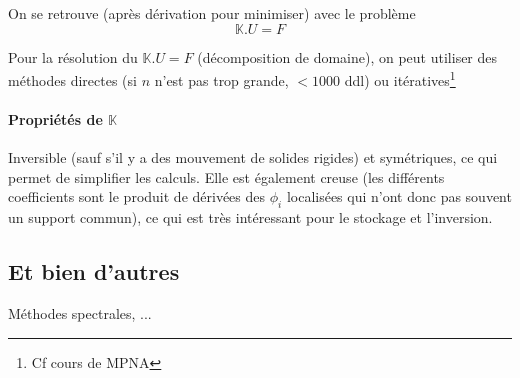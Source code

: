 \documentclass{article}
\begin{document}
On se retrouve (après dérivation pour minimiser) avec le problème 
\[\mathbb{K}.U=F\]

Pour la résolution du $\mathbb{K}.U=F$ (décomposition de domaine), on peut utiliser des méthodes directes (si $n$ n'est pas trop grande, $< 1000$ ddl) ou itératives\footnote{Cf cours de MPNA}

\paragraph{Propriétés de $\mathbb{K}$} Inversible (sauf s'il y a des mouvement de solides rigides) et symétriques, ce qui permet de simplifier les calculs. Elle est également creuse (les différents coefficients sont le produit de dérivées des $\phi_i$ localisées qui n'ont donc pas souvent un support commun), ce qui est très intéressant pour le stockage et l'inversion.

\subsection{Et bien d'autres}
Méthodes spectrales, ...
\end{document}
